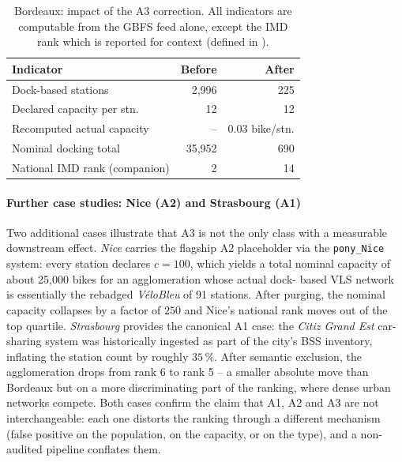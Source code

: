 \documentclass[a4paper,twoside]{article}
\begin{document}
\begin{table}[ht]
\centering
\caption{Bordeaux: impact of the A3 correction. All indicators
are computable from the GBFS feed alone, except the IMD rank
which is reported for context (defined in
\cite{Fosse2026imd}).}\label{tab:bordeaux}
\small
\begin{tabular}{@{}lrr@{}}
\toprule
\textbf{Indicator} & \textbf{Before} & \textbf{After}\\
\midrule
Dock-based stations         & 2{,}996 & 225 \\
Declared capacity per stn.\ & 12      & 12 \\
Recomputed actual capacity  & --      & 0.03 bike/stn.\\
Nominal docking total       & 35{,}952 & 690 \\
National IMD rank (companion) & 2     & 14 \\
\bottomrule
\end{tabular}
\end{table}

\paragraph{Further case studies: Nice (A2) and Strasbourg (A1)}
Two additional cases illustrate that A3 is not the only class
with a measurable downstream effect. \emph{Nice} carries the
flagship A2 placeholder via the \texttt{pony\_Nice} system: every
station declares $c = 100$, which yields a total nominal capacity
of about 25{,}000 bikes for an agglomeration whose actual dock-
based VLS network is essentially the rebadged \emph{V\'eloBleu}
of 91 stations. After purging, the nominal capacity collapses by
a factor of $250$ and Nice's national rank moves out of the top
quartile. \emph{Strasbourg} provides the canonical A1 case: the
\emph{Citiz Grand Est} car-sharing system was historically
ingested as part of the city's BSS inventory, inflating the
station count by roughly $35\,\%$. After semantic exclusion, the
agglomeration drops from rank 6 to rank 5 -- a smaller absolute
move than Bordeaux but on a more discriminating part of the
ranking, where dense urban networks compete. Both cases confirm
the claim that A1, A2 and A3 are not interchangeable: each one
distorts the ranking through a different mechanism (false
positive on the population, on the capacity, or on the type),
and a non-audited pipeline conflates them.
\end{document}
